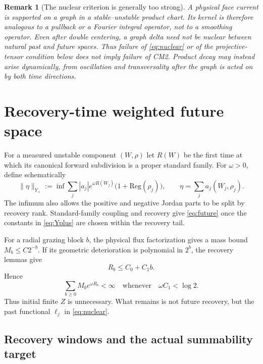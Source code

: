 \documentclass[11pt]{article}
\newtheorem{remark}[theorem]{Remark}
\begin{document}
\begin{remark}[The nuclear criterion is generally too strong]
\label{rem:nuclear-too-strong}
A physical face current is supported on a graph in a stable--unstable product
chart.  Its kernel is therefore analogous to a pullback or a Fourier integral
operator, not to a smoothing operator.  Even after double centering, a graph
delta need not be nuclear between natural past and future spaces.  Thus failure
of \eqref{eq:nuclear} or of the projective-tensor condition below does
\emph{not} imply failure of CM2.  Product decay may instead arise dynamically,
from oscillation and transversality after the graph is acted on by both time
directions.
\end{remark}

\section{Recovery-time weighted future space}

For a measured unstable component $(W,\rho)$ let $R(W)$ be the first time at
which its canonical forward subdivision is a proper standard family.  For
$\omega>0$, define schematically
\begin{equation}
\label{eq:Yplus}
 \|\eta\|_{Y_+}
 :=\inf\sum_j|a_j|e^{\omega R(W_j)}
       \bigl(1+\mathrm{Reg}(\rho_j)\bigr),
 \qquad
 \eta=\sum_ja_j(W_j,\rho_j).
\end{equation}
The infimum also allows the positive and negative Jordan parts to be split by
recovery rank.  Standard-family coupling and recovery give
\eqref{eq:future} once the constants in \eqref{eq:Yplus} are chosen within
the recovery tail.

For a radial grazing block $b$, the physical flux factorization gives a mass
bound $M_b\le C2^{-b}$.  If its geometric deterioration is polynomial in
$2^b$, the recovery lemmas give
\[
 R_b\le C_0+C_1b.
\]
Hence
\begin{equation}
\label{eq:recovery-sum}
 \sum_{b\ge0}M_be^{\omega R_b}<\infty
 \quad\text{whenever}\quad \omega C_1<\log2.
\end{equation}
Thus initial finite $Z$ is unnecessary.  What remains is not future recovery,
but the past functional $\ell_j$ in \eqref{eq:nuclear}.

\subsection{Recovery windows and the actual summability target}
\end{document}

